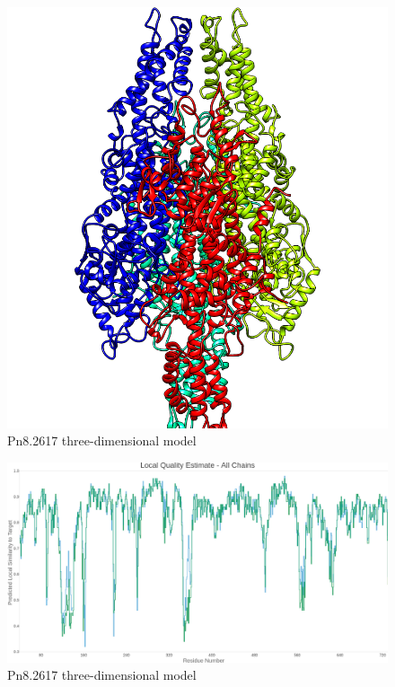 \documentclass[12pt]{article}
\begin{document}
	
	\FloatBarrier
	\begin{figure}[h]
		\centering
		\includegraphics[scale=0.3]{../1/Minimize/model.png}
		\caption{Pn8.2617 three-dimensional model}
		\label{fig1_1}
	\end{figure}
	\FloatBarrier
	
	\FloatBarrier
	\begin{figure}[h]
		\centering
		\includegraphics[width=\textwidth-50pt]{../1/Swiss/Local_quality_estimate.png}
		\caption{Pn8.2617 three-dimensional model}
		\label{fig1_2}
	\end{figure}
	\FloatBarrier
	
	
	\newpage
	
	
	
	
\end{document}
